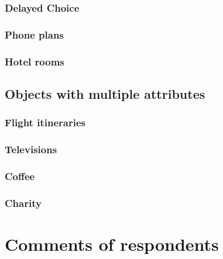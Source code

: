 \documentclass[11pt,letter]{article}
\begin{document}
\subsubsection{Delayed Choice}



\subsubsection{Phone plans}



\subsubsection{Hotel rooms}



\subsection{Objects with multiple attributes}

\subsubsection{Flight itineraries}



\subsubsection{Televisions}



\subsubsection{Coffee}



\subsubsection{Charity}



\section{Comments of respondents}



\end{document}
